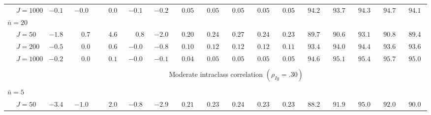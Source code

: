 \begin{sidewaystable}
\begin{threeparttable}
\begin{tabular}{llccccccccccccccc}
 & \nopagebreak $\;J=1000$  & ${-}0.1\phantom{0}$ & ${-}0.0\phantom{0}$ & $\phantom{-}0.0\phantom{0}$ & ${-}0.1\phantom{0}$ & ${-}0.2\phantom{0}$ & $\phantom{0}0.05\phantom{0}$ & $\phantom{0}0.05\phantom{0}$ & $\phantom{0}0.05\phantom{0}$ & $\phantom{0}0.05\phantom{0}$ & $\phantom{0}0.05\phantom{0}$ & $\phantom{0}94.2\phantom{0}$ & $\phantom{0}93.7\phantom{0}$ & $\phantom{0}94.3\phantom{0}$ & $\phantom{0}94.7\phantom{0}$ & $\phantom{0}94.1\phantom{0}$ \\
\multicolumn{4}{l}{$\bar{n}=20$} \\  & \nopagebreak $\;J=50$  & ${-}1.8\phantom{0}$ & $\phantom{-}0.7\phantom{0}$ & $\phantom{-}4.6\phantom{0}$ & $\phantom{-}0.8\phantom{0}$ & ${-}2.0\phantom{0}$ & $\phantom{0}0.20\phantom{0}$ & $\phantom{0}0.24\phantom{0}$ & $\phantom{0}0.27\phantom{0}$ & $\phantom{0}0.24\phantom{0}$ & $\phantom{0}0.23\phantom{0}$ & $\phantom{0}89.7\phantom{0}$ & $\phantom{0}90.6\phantom{0}$ & $\phantom{0}93.1\phantom{0}$ & $\phantom{0}90.8\phantom{0}$ & $\phantom{0}89.4\phantom{0}$ \\
 & \nopagebreak $\;J=200$  & ${-}0.5\phantom{0}$ & $\phantom{-}0.0\phantom{0}$ & $\phantom{-}0.6\phantom{0}$ & ${-}0.0\phantom{0}$ & ${-}0.8\phantom{0}$ & $\phantom{0}0.10\phantom{0}$ & $\phantom{0}0.12\phantom{0}$ & $\phantom{0}0.12\phantom{0}$ & $\phantom{0}0.12\phantom{0}$ & $\phantom{0}0.11\phantom{0}$ & $\phantom{0}93.4\phantom{0}$ & $\phantom{0}94.0\phantom{0}$ & $\phantom{0}94.4\phantom{0}$ & $\phantom{0}93.6\phantom{0}$ & $\phantom{0}93.6\phantom{0}$ \\
 & \nopagebreak $\;J=1000$  & ${-}0.2\phantom{0}$ & $\phantom{-}0.0\phantom{0}$ & $\phantom{-}0.1\phantom{0}$ & ${-}0.0\phantom{0}$ & ${-}0.1\phantom{0}$ & $\phantom{0}0.04\phantom{0}$ & $\phantom{0}0.05\phantom{0}$ & $\phantom{0}0.05\phantom{0}$ & $\phantom{0}0.05\phantom{0}$ & $\phantom{0}0.05\phantom{0}$ & $\phantom{0}94.6\phantom{0}$ & $\phantom{0}95.1\phantom{0}$ & $\phantom{0}95.4\phantom{0}$ & $\phantom{0}95.7\phantom{0}$ & $\phantom{0}95.0\phantom{0}$ \\
[0.5ex]\hline\\[-1.6ex] 
& & \multicolumn{15}{c}{Moderate intraclass correlation $(\rho_{Iy}=.30)$} \\[0.6ex]\hline\\[-1.8ex]
\multicolumn{4}{l}{$\bar{n}=5$} \\  & \nopagebreak $\;J=50$  & ${-}3.4\phantom{0}$ & ${-}1.0\phantom{0}$ & $\phantom{-}2.0\phantom{0}$ & ${-}0.8\phantom{0}$ & ${-}2.9\phantom{0}$ & $\phantom{0}0.21\phantom{0}$ & $\phantom{0}0.23\phantom{0}$ & $\phantom{0}0.24\phantom{0}$ & $\phantom{0}0.23\phantom{0}$ & $\phantom{0}0.23\phantom{0}$ & $\phantom{0}88.2\phantom{0}$ & $\phantom{0}91.9\phantom{0}$ & $\phantom{0}95.0\phantom{0}$ & $\phantom{0}92.0\phantom{0}$ & $\phantom{0}90.0\phantom{0}$ \\

\end{tabular}
\end{threeparttable}
\end{sidewaystable}
